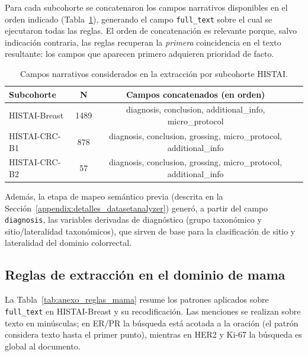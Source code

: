 Para cada subcohorte se concatenaron los campos narrativos disponibles en el orden indicado (Tabla~\ref{tab:anexo_campos_histai}), generando el campo \texttt{full\_text} sobre el cual se ejecutaron todas las reglas. El orden de concatenación es relevante porque, salvo indicación contraria, las reglas recuperan la \emph{primera} coincidencia en el texto resultante: los campos que aparecen primero adquieren prioridad de facto.

\begin{table}[htbp]
\centering
\caption{Campos narrativos considerados en la extracción por subcohorte HISTAI.}
\label{tab:anexo_campos_histai}
\small
\begin{tabular}{lccl}
\toprule
Subcohorte & N & Campos concatenados (en orden) \\
\midrule
HISTAI-Breast & 1489 & diagnosis, conclusion, additional\_info, micro\_protocol  \\
HISTAI-CRC-B1 & 878 & diagnosis, conclusion, grossing, micro\_protocol, additional\_info  \\
HISTAI-CRC-B2 & 57 & diagnosis, conclusion, grossing, micro\_protocol, additional\_info  \\
\bottomrule
\end{tabular}
\end{table}

Además, la etapa de mapeo semántico previa (descrita en la Sección~\ref{appendix:detalles_datasetanalyzer}) generó, a partir del campo \texttt{diagnosis}, las variables derivadas de diagnóstico (grupo taxonómico y sitio/lateralidad taxonómicos), que sirven de base para la clasificación de sitio y lateralidad del dominio colorrectal.

\subsection{Reglas de extracción en el dominio de mama}

La Tabla~\ref{tab:anexo_reglas_mama} resume los patrones aplicados sobre \texttt{full\_text} en HISTAI-Breast y su recodificación. Las menciones se realizan sobre texto en minúsculas; en ER/PR la búsqueda está acotada a la oración (el patrón considera texto hasta el primer punto), mientras en HER2 y Ki-67 la búsqueda es global al documento.


